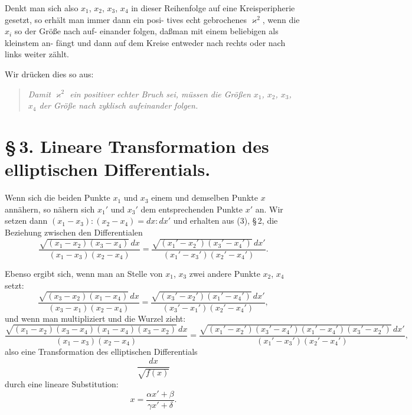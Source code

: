 \documentclass[12pt,a4paper]{book}
\theoremstyle{definition}
\begin{document}
Denkt man sich also $x_1$, $x_2$, $x_3$, $x_4$ in dieser Reihenfolge auf
eine Kreisperipherie gesetzt, so erh\"alt man immer dann ein posi-
tives echt gebrochenes $\varkappa^2$, wenn die $x_i$ so der Gr\"o\ss e nach auf-
einander folgen, da\ss man mit einem beliebigen als kleinstem an-
f\"angt und dann auf dem Kreise entweder nach rechts oder nach
links weiter z\"ahlt.

Wir dr\"ucken dies so aus:
\begin{quote}
\textit{Damit $\varkappa^2$ ein positiver echter Bruch sei, m\"ussen die
Gr\"o\ss en $x_1$, $x_2$, $x_3$, $x_4$ der Gr\"o\ss e nach zyklisch aufeinander
folgen.}
\end{quote}

\section*{\S\,3. Lineare Transformation des elliptischen Differentials.}

Wenn sich die beiden Punkte $x_1$ und $x_3$ einem und demselben
Punkte $x$ ann\"ahern, so n\"ahern sich $x_1'$ und $x_3'$ dem entsprechenden
Punkte $x'$ an. Wir setzen dann $(x_1 - x_3):(x_2 - x_4) = dx:dx'$ und
erhalten aus (3), \S\,2, die Beziehung zwischen den Differentialen
\begin{equation}
\frac{\sqrt{(x_1 - x_2)(x_3 - x_4)}\,dx}{(x_1 - x_3)(x_2 - x_4)} = \frac{\sqrt{(x_1' - x_2')(x_3' - x_4')}\,dx'}{(x_1' - x_3')(x_2' - x_4')}. \tag{1}
\end{equation}

Ebenso ergibt sich, wenn man an Stelle von $x_1$, $x_3$ zwei
andere Punkte $x_2$, $x_4$ setzt:
\begin{equation}
\frac{\sqrt{(x_3 - x_2)(x_1 - x_4)}\,dx}{(x_3 - x_1)(x_2 - x_4)} = \frac{\sqrt{(x_3' - x_2')(x_1' - x_4')}\,dx'}{(x_3' - x_1')(x_2' - x_4')}, \tag{2}
\end{equation}
und wenn man multipliziert und die Wurzel zieht:
\begin{equation}
\frac{\sqrt{(x_1 - x_2)(x_3 - x_4)(x_1 - x_4)(x_3 - x_2)}\,dx}{(x_1 - x_3)(x_2 - x_4)} = \frac{\sqrt{(x_1' - x_2')(x_3' - x_4')(x_1' - x_4')(x_3' - x_2')}\,dx'}{(x_1' - x_3')(x_2' - x_4')}, \tag{3}
\end{equation}
also eine Transformation des elliptischen Differentials
\[
\frac{dx}{\sqrt{f(x)}}
\]
durch eine lineare Substitution:
\[
x = \frac{\alpha x' + \beta}{\gamma x' + \delta}.
\]
\end{document}
